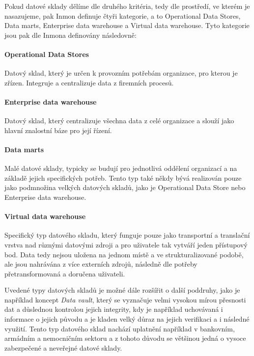 \documentclass[
  digital,     %
  twoside,     %
  lof,         %
  lot,         %
]{fithesis4}
\begin{document}
 \vspace{5mm}
Pokud datové sklady dělíme dle druhého kritéria, tedy dle prostředí, ve kterém je
nasazujeme, pak Inmon definuje čtyři kategorie, a to Operational Data Stores, Data marts,
Enterprise data warehouse a Virtual data warehouse. Tyto kategorie jsou pak dle Inmona definovány následovně:

\paragraph{Operational Data Stores}
Datový sklad, který je určen k provozním potřebám organizace, pro kterou je zřízen. Integruje a centralizuje data z firemních procesů.
\paragraph{Enterprise data warehouse}
Datový sklad, který centralizuje všechna data z celé organizace a slouží jako hlavní znalostní báze pro její řízení.
\paragraph{Data marts}
Malé datové sklady, typicky se budují pro jednotlivá oddělení organizací a na základě jejich specifických potřeb. Tento typ také někdy bývá realizován pouze jako podmnožina velkých datových skladů, jako je Operational Data Store nebo Enterprise data warehouse.\parencite{Inmon2021}
\paragraph{Virtual data warehouse}
Specifický typ datového skladu, který funguje pouze jako transportní a translační vrstva nad různými datovými zdroji a pro uživatele tak vytváří jeden přístupový bod. Data tedy nejsou uložena na jednom místě a ve strukturalizované podobě, ale jsou nahrávána z více externích zdrojů, následně dle potřeby přetransformovaná a doručena uživateli. 

\vspace{5mm}
Uvedené typy datových skladů je možné dále rozšířit o další poddruhy, jako je například koncept \emph{Data vault}, který se vyznačuje velmi vysokou mírou přesnosti dat a důslednou kontrolou jejich integrity, kdy je například uchovávaná i informace o jejich původu a je kladen velký důraz na jejich verifikaci a i následné využití. Tento typ datového sklad nachází uplatnění například v bankovním, armádním a nemocničním sektoru a z tohoto důvodu se většinou jedná o vysoce zabezpečené a neveřejné datové sklady.\parencite{Inmon2021}
\end{document}
